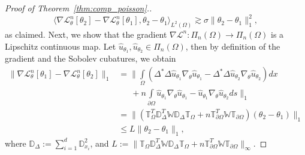 \documentclass[pdflatex]{sn-jnl}%
\begin{document}
\begin{proof}[Proof of Theorem~\ref{thm:comp_poisson}.]
\begin{equation}
    \langle\nabla\mathcal{L}^n_\theta[\theta_2]-\nabla\mathcal{L}^n_\theta[\theta_1],\theta_2-\theta_1 \rangle_{L^2(\Omega)}\gtrsim \sigma \|\theta_2-\theta_1\|_1^2,
\end{equation}
as claimed. 
Next, we show that the gradient $\nabla\mathcal{L}^n:\Pi_n(\Omega)\rightarrow \Pi_n(\Omega)$ is a Lipschitz continuous map. Let $\hat{u}_{\theta_1},\hat{u}_{\theta_2}\in \Pi_{n}(\Omega)$, then by definition of the gradient and the Sobolev cubatures, we obtain 
\begin{equation}
\begin{aligned}
        \|\nabla\mathcal{L}^n_\theta[\theta_1]-\nabla\mathcal{L}^n_\theta[\theta_2]\|_1&= \biggr\|\int\limits_{\Omega}(\Delta^*\Delta \hat{u}_{\theta_1}\nabla_{\theta}\hat{u}_{\theta_1}-\Delta^*\Delta\hat{u}_{\theta_2}\nabla_{\theta}\hat{u}_{\theta_2})dx\\&\,\,\,\,\,\,\,\,\,+n\int\limits_{\partial\Omega}\hat{u}_{\theta_1}\nabla_{\theta}\hat{u}_{\theta_1}-\hat{u}_{\theta_1}\nabla_{\theta}\hat{u}_{\theta_2}ds\biggr\|_1
        \\&
       =  \|(\mathbb{T}_{\Omega}^T\mathbb{D}_\Delta^T\mathbb{W}\mathbb{D}_\Delta\mathbb{T}_{\Omega}+ n\mathbb{T}_{\partial\Omega}^T\mathbb{W}\mathbb{T}_{\partial\Omega})(\theta_2-\theta_1)\|_1\\&
       \leq L\|\theta_2-\theta_1\|_1,
\end{aligned}
\end{equation}
where $\mathbb{D}_\Delta:=\sum\limits_{i=1}^d\mathbb{D}_{x_i}^2$, and $L:= \|\mathbb{T}_{\Omega}\mathbb{D}_\Delta^T\mathbb{W}\mathbb{D}_\Delta\mathbb{T}_{\Omega}+n\mathbb{T}_{\partial\Omega}^T\mathbb{W}\mathbb{T}_{\partial\Omega}\|_\infty$.

\end{proof}
\end{document}
